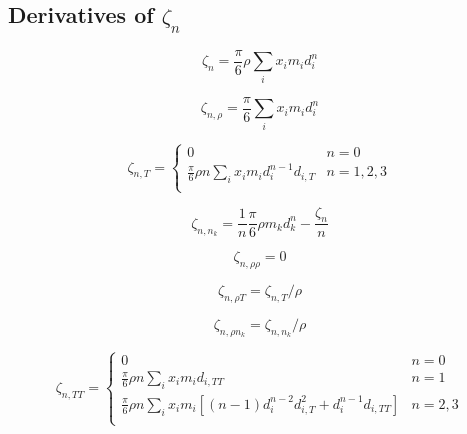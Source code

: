 \documentclass[english]{../thermomemo/thermomemo}
\newcommand*{\pdder}[2]{\left(\frac{\partial^2 #1}{\partial #2^2}\right)}
\newcommand{\z}{\zeta}
\begin{document}

\subsection{Derivatives of $\z_n$}
\begin{equation}
  \z_{n} = \frac{\pi}{6} \rho \sum_i x_i m_i d_i^n
\end{equation}

\begin{equation}
  \z_{n,\rho} = \frac{\pi}{6} \sum_i x_i m_i d_i^n
\end{equation}

\begin{equation}
  \z_{n,T} = \begin{cases}
    0 & n = 0 \\ 
    \frac{\pi}{6} \rho n \sum_i x_i m_i d_i^{n-1} d_{i,T} & n = 1,2,3 \\
  \end{cases}
\end{equation}

\begin{equation}
  \z_{n,n_k} = \frac{1}{n} \frac{\pi}{6} \rho m_k d_k^n - \frac{\z_n}{n}
\end{equation}

\begin{equation}
  \z_{n,\rho\rho} = 0
\end{equation}

\begin{equation}
  \z_{n,\rho T} = \z_{n,T}/\rho
\end{equation}

\begin{equation}
  \z_{n,\rho n_k} = \z_{n,n_k}/\rho
\end{equation}

\begin{equation}
  \z_{n,TT} = \begin{cases}
    0 & n = 0 \\
    \frac{\pi}{6} \rho n \sum_i x_i m_i d_{i,TT} & n = 1 \\
    \frac{\pi}{6} \rho n \sum_i x_i m_i \left[ (n-1) d_i^{n-2} d_{i,T}^2 + d_i^{n-1} d_{i,TT} \right] & n = 2,3 \\
  \end{cases}
\end{equation}
\end{document}
